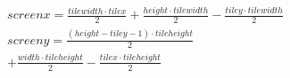 \begin{equation}
    \begin{gathered}
      screenx = \frac{tilewidth \cdot tilex}{2} + \frac{height \cdot tilewidth}{2} - \frac{tiley \cdot tilewidth}{2}
      \\
      screeny = \frac{ \left( height - tiley - 1 \right) \cdot tileheight}{2}
      \\
      + \frac{width \cdot tileheight}{2} - \frac{tilex \cdot tileheight}{2}
    \end{gathered}
    \label{equations:cart_to_iso}
\end{equation}

